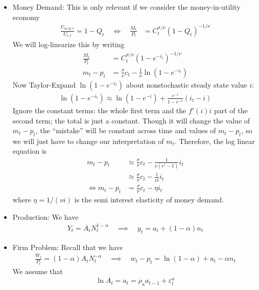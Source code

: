 \documentclass[12pt]{article}
\theoremstyle{plain}
\theoremstyle{definition}
\theoremstyle{remark}
\begin{document}
\begin{itemize}
  \item Money Demand:
    This is only relevant if we consider the money-in-utility economy
    \begin{align*}
      \frac{U_{m/p,t}}{U_{c,t}}
      =
      1 - Q_t
      \quad\iff\quad
      \frac{M_t}{P_t}
      &=
      C_t^{\sigma/\nu}(1 - Q_t)^{-1/\nu}
    \end{align*}
    We will log-linearize this by writing
    \begin{align*}
      \frac{M_t}{P_t}
      &=
      C_t^{\sigma/\nu}(1 - e^{-i_t})^{-1/\nu} \\
      m_t - p_t
      &=
      \frac{\sigma}{\nu}c_t
      -\frac{1}{\nu}\ln (1 - e^{-i_t})
    \end{align*}
    Now Taylor-Expand $\ln(1-e^{-i_t})$ about nonstochastic steady state
    value $i$:
    \begin{align*}
      \ln(1-e^{-i_t})\approx
      \ln(1-e^{-i})
      + \frac{e^{-i}}{1-e^{-i}}
      (i_t-i)
    \end{align*}
    Ignore the constant terms: the whole first term and the $f'(i)i$
    part of the second term; the total is just a constant. Though it
    will change the value of $m_t-p_t$, the ``mistake'' will be constant
    across time and values of $m_t-p_t$, so we will just have to change
    our interpretation of $m_t$. Therefore, the log linear equation is
    \begin{align*}
      m_t - p_t
      &\approx
      \frac{\sigma}{\nu}c_t
      - \frac{1}{\nu(e^{i}-1)}
      i_t \\
      &\approx
      \frac{\sigma}{\nu}c_t
      - \frac{1}{\nu i} i_t \\
      \iff
      m_t - p_t
      &=
      \frac{\sigma}{\nu}c_t
      - \eta i_t
    \end{align*}
    where $\eta=1/(\nu i)$ is the semi interest elasticity of money
    demand.


  \item Production: We have
    \begin{align*}
      Y_t = A_t N_t^{1-\alpha}
      \quad\implies\quad
      y_t = a_t + (1-\alpha)n_t
    \end{align*}

  \item Firm Problem: Recall that we have
    \begin{align*}
      \frac{W_t}{P_t} = (1-\alpha)A_t N_t^{-\alpha}
      \quad\implies\quad
      w_t - p_t
      = \ln(1-\alpha) + a_t - \alpha n_t
    \end{align*}
    We assume that
    \begin{align*}
      \ln A_t = a_t = \rho_a a_{t-1} + \varepsilon_t^a
    \end{align*}


\end{itemize}
\end{document}
